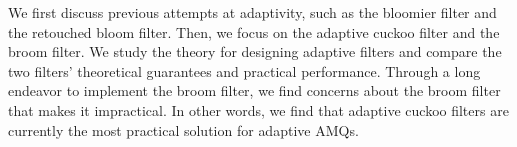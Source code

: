 \documentclass[../paper.tex]{subfiles}
\begin{document}
    We first discuss previous attempts at adaptivity, such as the bloomier filter
    and the retouched bloom filter. Then, we focus on the adaptive cuckoo filter
    and the broom filter. We study the theory for designing adaptive filters and
    compare the two filters' theoretical guarantees and practical performance.
    Through a long endeavor to implement the broom filter, we find concerns about
    the broom filter that makes it impractical. In other words, we find that adaptive cuckoo
    filters are currently the most practical solution for adaptive AMQs.
\end{document}
